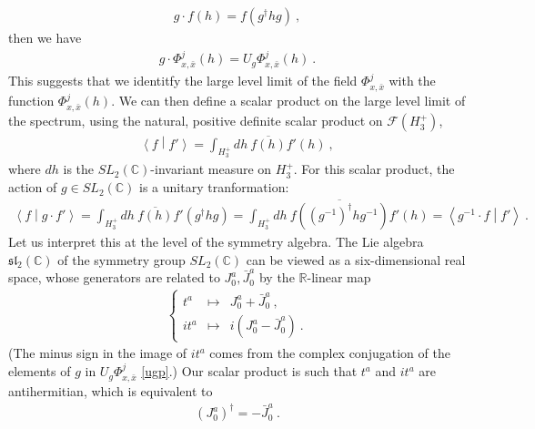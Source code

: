 \documentclass[12pt, a4paper, notitlepage, twoside]{report}
\numberwithin{equation}{section}
\theoremstyle{break}
\begin{document}
\begin{align}
 g\cdot f(h) = f(g^\dagger h g)\ ,
\end{align}
then we have 
\begin{align}
 g\cdot \Phi^j_{x,\bar{x}}(h) = U_g \Phi^j_{x,\bar{x}}(h)\ .
\end{align}
This suggests that we identitfy the large level limit of the field $\Phi^j_{x,\bar{x}}$ with the function $\Phi^j_{x,\bar{x}}(h)$. 
We can then define a scalar product on the large level limit of the spectrum, using the natural, positive definite scalar product on $\mathcal{F}(H_3^+)$, 
\begin{align}
 \left\langle f \middle| f' \right\rangle = \int_{H_3^+} dh\ \overline{f(h)} f'(h)\ ,
\end{align}
where $dh$ is the $SL_2({\mathbb{C}})$-invariant measure on $H_3^+$.
For this scalar product, the action of $g\in SL_2({\mathbb{C}})$ is a unitary tranformation:
\begin{align}
 \left\langle f \middle| g\cdot f'\right\rangle = \int_{H_3^+}dh\ \overline{f(h)} f'(g^\dagger h g) = \int_{H_3^+}dh\ \overline{f((g^{-1})^\dagger h g^{-1})} f'(h) = \left\langle g^{-1}\cdot f \middle| f'\right\rangle\ .
\end{align}
Let us interpret this at the level of the symmetry algebra.
The Lie algebra $\mathfrak{sl}_2({\mathbb{C}})$ of the symmetry group $SL_2({\mathbb{C}})$ can be viewed as a six-dimensional real space, whose generators are related to $J^a_0, \bar{J}^a_0$ by the ${\mathbb{R}}$-linear map
\begin{align}
 \left\{\begin{array}{lcl} t^a & \mapsto & J_0^a + \bar{J}_0^a \ ,  \\ it^a & \mapsto & i(J^a_0 - \bar{J}^a_0)\ . \end{array}\right. 
\end{align}
(The minus sign in the image of $it^a$ comes from the complex conjugation of the elements of $g$ in $U_g\Phi^j_{x,\bar{x}}$ \eqref{ugp}.)
Our scalar product is such that $t^a$ and $it^a$ are antihermitian, which is equivalent to
\begin{align}
 (J^a_0)^\dagger = -\bar{J}^a_0\ .
\label{jzd}
\end{align}
\end{document}
